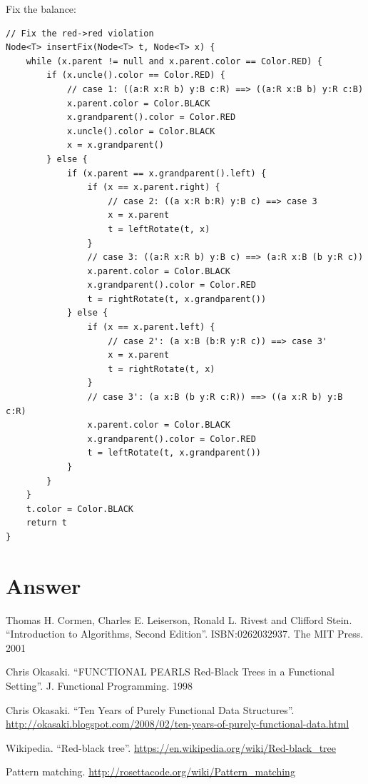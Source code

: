 \documentclass[b5paper]{article}
\begin{document}
Fix the balance:

\begin{lstlisting}[language = Bourbaki]
// Fix the red->red violation
Node<T> insertFix(Node<T> t, Node<T> x) {
    while (x.parent != null and x.parent.color == Color.RED) {
        if (x.uncle().color == Color.RED) {
            // case 1: ((a:R x:R b) y:B c:R) ==> ((a:R x:B b) y:R c:B)
            x.parent.color = Color.BLACK
            x.grandparent().color = Color.RED
            x.uncle().color = Color.BLACK
            x = x.grandparent()
        } else {
            if (x.parent == x.grandparent().left) {
                if (x == x.parent.right) {
                    // case 2: ((a x:R b:R) y:B c) ==> case 3
                    x = x.parent
                    t = leftRotate(t, x)
                }
                // case 3: ((a:R x:R b) y:B c) ==> (a:R x:B (b y:R c))
                x.parent.color = Color.BLACK
                x.grandparent().color = Color.RED
                t = rightRotate(t, x.grandparent())
            } else {
                if (x == x.parent.left) {
                    // case 2': (a x:B (b:R y:R c)) ==> case 3'
                    x = x.parent
                    t = rightRotate(t, x)
                }
                // case 3': (a x:B (b y:R c:R)) ==> ((a x:R b) y:B c:R)
                x.parent.color = Color.BLACK
                x.grandparent().color = Color.RED
                t = leftRotate(t, x.grandparent())
            }
        }
    }
    t.color = Color.BLACK
    return t
}
\end{lstlisting}

\ifx\wholebook\relax \else
\section{Answer}
\shipoutAnswer

\begin{thebibliography}{99}

Thomas H. Cormen, Charles E. Leiserson, Ronald L. Rivest and Clifford Stein.
``Introduction to Algorithms, Second Edition''. ISBN:0262032937. The MIT Press. 2001

Chris Okasaki. ``FUNCTIONAL PEARLS Red-Black Trees in a Functional Setting''. J. Functional Programming. 1998

Chris Okasaki. ``Ten Years of Purely Functional Data Structures''. \url{http://okasaki.blogspot.com/2008/02/ten-years-of-purely-functional-data.html}

Wikipedia. ``Red-black tree''. \url{https://en.wikipedia.org/wiki/Red-black_tree}

Pattern matching. \url{http://rosettacode.org/wiki/Pattern_matching}

\end{thebibliography}

\expandafter\enddocument
\fi
\end{document}
